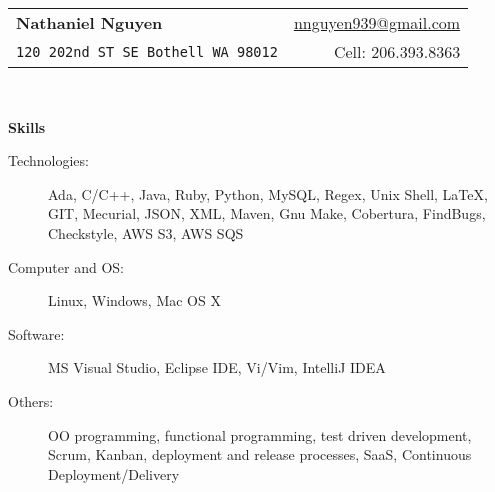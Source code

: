 \documentclass[letterpaper,11pt]{article}
\newcommand{\resheading}[1]{{\large \colorbox{mygrey}{\begin{minipage}{\textwidth}{\textbf{#1 \vphantom{p\^{E}}}}\end{minipage}}}}
\begin{document}
\newcommand{\mywebheader}{
\begin{tabular*}{7in}{l@{\extracolsep{\fill}}r}
	\textbf{{\LARGE Nathaniel Nguyen}} & \href{mailto:nnguyen939@gmail.com}{nnguyen939@gmail.com}\\
	{\footnotesize \texttt{{120 202nd ST SE Bothell WA 98012}}} & 
	{Cell:  206.393.8363}
	\end{tabular*}
\\
\vspace{0.1in}}

\mywebheader

\resheading{{Skills}}
	\begin{description}
		\item[Technologies:] { \footnotesize Ada, C/C++, Java, Ruby, Python, MySQL, Regex, Unix Shell, {\LaTeX}, GIT, Mecurial, JSON, XML, Maven, Gnu Make, Cobertura, FindBugs, Checkstyle, AWS S3, AWS SQS}
		\item[Computer and OS:] { \footnotesize Linux, Windows, Mac OS X}
		\item[Software:]{\footnotesize
			{MS Visual Studio},
			{Eclipse IDE},
			{Vi/Vim}, {IntelliJ IDEA}} 
		\item[Others:] {\footnotesize OO programming, functional programming,  test driven development, Scrum,  Kanban, deployment and release processes, SaaS, Continuous Deployment/Delivery}
	\end{description} %
	
\end{document}
